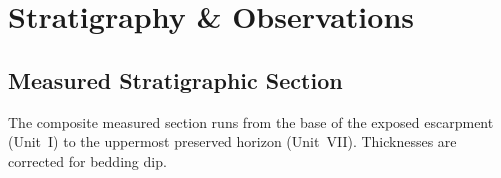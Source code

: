 \documentclass[11pt,a4paper]{article}
\begin{document}
\section{Stratigraphy \& Observations}

\subsection{Measured Stratigraphic Section}

The composite measured section runs from the base of the exposed escarpment
(Unit~I) to the uppermost preserved horizon (Unit~VII).
Thicknesses are corrected for bedding dip.

\vspace{8pt}
\end{document}
